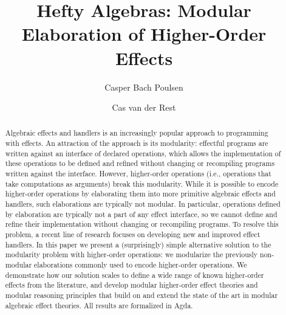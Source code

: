 \documentclass[draft]{jfp}
\begin{document}
\raggedbottom

\title{Hefty Algebras: Modular Elaboration of Higher-Order Effects}
% 
% 
%

\begin{authgrp}
\author{Casper Bach Poulsen}
\author{Cas van der Rest}
\end{authgrp}

\begin{abstract}
  Algebraic effects and handlers is an increasingly popular approach to
  programming with effects.  An attraction of the approach is its modularity:
  effectful programs are written against an interface of declared operations,
  which allows the implementation of these operations to be defined and refined
  without changing or recompiling programs written against the interface.
  However, higher-order operations (i.e., operations that take computations as
  arguments) break this modularity.  While it is possible to encode higher-order
  operations by elaborating them into more primitive algebraic effects and
  handlers, such elaborations are typically not modular.  In particular,
  operations defined by elaboration are typically not a part of any effect
  interface, so we cannot define and refine their implementation without
  changing or recompiling programs.  To resolve this problem, a recent line of
  research focuses on developing new and improved effect handlers.  In this
  paper we present a (surprisingly) simple alternative solution to the
  modularity problem with higher-order operations: we modularize the previously
  non-modular elaborations commonly used to encode higher-order operations.  We
  demonstrate how our solution scales to define a wide range of known
  higher-order effects from the literature, and develop modular higher-order
  effect theories and modular reasoning principles that build on and extend the
  state of the art in modular algebraic effect theories.  All results are
  formalized in Agda.
\end{abstract}
\end{document}
